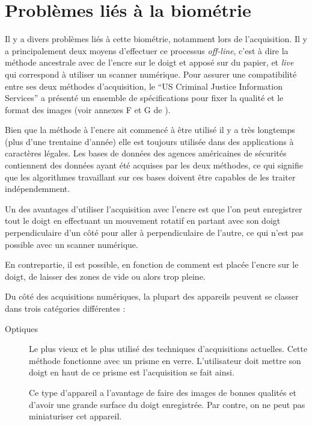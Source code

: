 \section{Problèmes liés à la biométrie}

Il y a divers problèmes liés à cette biométrie, notamment lors de
l'acquisition. Il y a principalement deux moyens d'effectuer ce
processus \emph{off-line}, c'est à dire la méthode ancestrale avec de
l'encre sur le doigt et apposé sur du papier, et \emph{live} qui
correspond à utiliser un scanner numérique. Pour assurer une
compatibilité entre ses deux méthodes d'acquisition, le ``US Criminal
Justice Information Services'' a présenté un ensemble de
spécifications pour fixer la qualité et le format des images (voir
annexes F et G de \cite{nla.cat-vn4185009}).

Bien que la méthode à l'encre ait commencé à être utilisé il y a très
longtemps (plus d'une trentaine d'année) elle est toujours utilisée
dans des applications à caractères légales. Les bases de données des
agences américaines de sécurités contiennent des données ayant été
acquises par les deux méthodes, ce qui signifie que les algorithmes
travaillant sur ces bases doivent être capables de les traiter
indépendemment.

Un des avantages d'utiliser l'acquisition avec l'encre est que l'on
peut enregistrer tout le doigt en effectuant un mouvement rotatif en
partant avec son doigt perpendiculaire d'un côté pour aller à
perpendiculaire de l'autre, ce qui n'est pas possible avec un scanner
numérique.

En contrepartie, il est possible, en fonction de comment est placée
l'encre sur le doigt, de laisser des zones de vide ou alors trop
pleine.


Du côté des acquisitions numériques, la plupart des appareils peuvent
se classer dans trois catégories différentes :

\begin{description}
\item[Optiques] Le plus vieux et le plus utilisé des techniques
  d'acquisitions actuelles. Cette méthode fonctionne avec un prisme en
  verre. L'utilisateur doit mettre son doigt en haut de ce prisme est
  l'acquisition se fait ainsi.

  Ce type d'appareil a l'avantage de faire des images de bonnes
  qualités et d'avoir une grande surface du doigt enregistrée. Par
  contre, on ne peut pas miniaturiser cet appareil.
\end{description}

